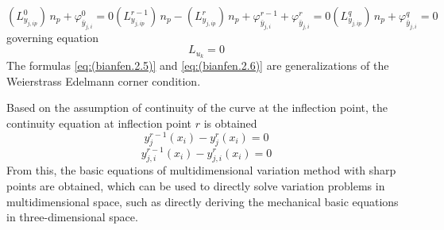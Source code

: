 \begin{subequations}\label{eq:(bianfen.2.6)}  
\begin{equation}   
\left(L^0_{y_{j,ip}}  \right)\,n_p +\varphi^0_{\bar {y}_ {j,i}} =0
\end{equation}
\begin{equation} 
\left(L^ {r-1}_ {y_{j,ip}}  \right)\,n_p  -\left(L^ {r}_ {y_{j, ip}}  \right)\,n_p +\varphi^ {r-1}_ {\bar {y}_ {j,i}}+\varphi^ {r}_ {\bar {y}_ {j,i}}=0
\end{equation}
\begin{equation}    
\left(L^q_{y_{j,ip}}  \right)\,n_p +\varphi^q_{\bar {y}_ {j,i}} =0
\end{equation}
\end{subequations}
governing equation 
\begin{equation} \label{eq:(bianfen.2.7)}    
L_{u_k} =0
\end{equation}
The formulas  \ref{eq:(bianfen.2.5)} and \ref {eq:(bianfen.2.6)} are generalizations of the Weierstrass Edelmann corner condition.

Based on the assumption of continuity of the curve at the inflection point, the continuity equation at inflection point $ r $ is obtained
\begin{equation} \label{eq:(bianfen.2.8)}    
y^ {r-1}_ {j}(x_i)-y^ {r}_ {j}(x_i)=0
\end{equation}
\begin{equation} \label{eq:(bianfen.2.9)}    
y^ {r-1}_ {j,i}(x_i)-y^ {r}_ {j,i}(x_i)=0
\end{equation}
From this, the basic equations of multidimensional variation method with sharp points are obtained, which can be used to directly solve variation problems in multidimensional space, such as directly deriving the mechanical basic equations in three-dimensional space.


